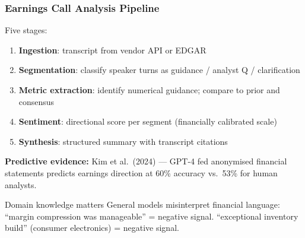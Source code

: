 \documentclass[9pt,t]{beamer}
\begin{document}
\begin{frame}
\frametitle{Earnings Call Analysis Pipeline}

Five stages:
\begin{enumerate}
  \item \textbf{Ingestion}: transcript from vendor API or EDGAR
  \item \textbf{Segmentation}: classify speaker turns as guidance / analyst Q / clarification
  \item \textbf{Metric extraction}: identify numerical guidance; compare to prior and consensus
  \item \textbf{Sentiment}: directional score per segment (financially calibrated scale)
  \item \textbf{Synthesis}: structured summary with transcript citations
\end{enumerate}

\medskip
\textbf{Predictive evidence:} Kim et al.\ (2024) --- GPT-4 fed anonymised financial statements
predicts earnings direction at 60\% accuracy vs.\ 53\% for human analysts.

\medskip
\begin{alertblock}{Domain knowledge matters}
General models misinterpret financial language:
``margin compression was manageable'' = negative signal.
``exceptional inventory build'' (consumer electronics) = negative signal.
\end{alertblock}
\end{frame}
\end{document}
